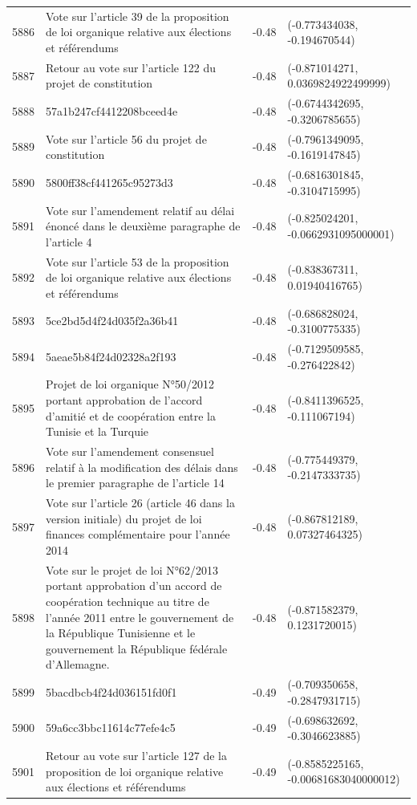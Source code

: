 \begin{table}[ht]
\begin{tabular}{rlrl}
  5886 & Vote sur l'article 39 de la proposition de loi organique relative aux élections et référendums & -0.48 & (-0.773434038, -0.194670544) \\ 
  5887 & Retour au vote sur l'article 122 du projet de constitution & -0.48 & (-0.871014271, 0.0369824922499999) \\ 
  5888 & 57a1b247cf4412208bceed4e & -0.48 & (-0.6744342695, -0.3206785655) \\ 
  5889 & Vote sur l'article 56 du projet de constitution & -0.48 & (-0.7961349095, -0.1619147845) \\ 
  5890 & 5800ff38cf441265c95273d3 & -0.48 & (-0.6816301845, -0.3104715995) \\ 
  5891 & Vote sur l'amendement relatif au délai énoncé dans le deuxième paragraphe de l'article 4 & -0.48 & (-0.825024201, -0.0662931095000001) \\ 
  5892 & Vote sur l'article 53 de la proposition de loi organique relative aux élections et référendums & -0.48 & (-0.838367311, 0.01940416765) \\ 
  5893 & 5ce2bd5d4f24d035f2a36b41 & -0.48 & (-0.686828024, -0.3100775335) \\ 
  5894 & 5aeae5b84f24d02328a2f193 & -0.48 & (-0.7129509585, -0.276422842) \\ 
  5895 & Projet de loi organique N°50/2012 portant approbation de l'accord d'amitié et de coopération entre la Tunisie et la Turquie & -0.48 & (-0.8411396525, -0.111067194) \\ 
  5896 & Vote sur l'amendement consensuel relatif à la modification des délais dans le premier paragraphe de l'article 14 & -0.48 & (-0.775449379, -0.2147333735) \\ 
  5897 & Vote sur l'article 26 (article 46 dans la version initiale) du projet de loi finances complémentaire pour l'année 2014 & -0.48 & (-0.867812189, 0.07327464325) \\ 
  5898 & Vote sur le projet de loi N°62/2013 portant approbation d'un accord de coopération technique au titre de l'année 2011 entre le gouvernement de la République Tunisienne et le gouvernement la République fédérale d'Allemagne. & -0.48 & (-0.871582379, 0.1231720015) \\ 
  5899 & 5bacdbcb4f24d036151fd0f1 & -0.49 & (-0.709350658, -0.2847931715) \\ 
  5900 & 59a6cc3bbc11614c77efe4c5 & -0.49 & (-0.698632692, -0.3046623885) \\ 
  5901 & Retour au vote sur l'article 127 de la proposition de loi organique relative aux élections et référendums & -0.49 & (-0.8585225165, -0.00681683040000012) \\ 

\end{tabular}
\end{table}

